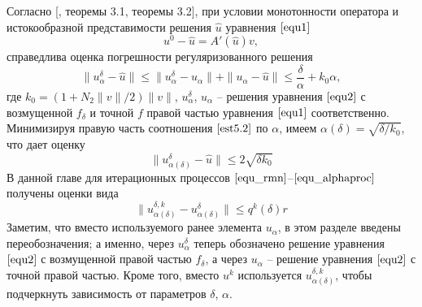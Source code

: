 Согласно [\cite{Tau2002}, теоремы 3.1, теоремы 3.2], при условии монотонности оператора и истокообразной представимости решения $\hat{u}$ уравнения $\eqref{equ1}$
\begin{equation}\label{cond5.1}
u^0-\hat{u}=A'(\hat{u})v,
\end{equation}
справедлива оценка погрешности регуляризованного решения
\begin{equation}\label{est5.2}
\|u_\alpha^{\delta}-\hat{u}\|\le\|u_\alpha^{\delta}-u_\alpha\|+\|u_\alpha-\hat{u}\|\le\frac{\delta}{\alpha}+k_0\alpha,
\end{equation}
где $k_0=(1+N_2\|v\|/2)\|v\|$, $u_\alpha^{\delta}$, $u_\alpha$ -- решения уравнения $\eqref{equ2}$ с возмущенной $f_\delta$ и точной $f$ правой частью уравнения $\eqref{equ1}$ соответственно. Минимизируя правую часть соотношения $\eqref{est5.2}$ по $\alpha$, имеем $\alpha(\delta)=\sqrt{\delta /k_0}$, что дает оценку
\begin{equation}\label{est5.3}
\|u_{\alpha(\delta)}^{\delta}-\hat{u}\|\le 2\sqrt{\delta k_0}
\end{equation}
В данной главе для итерационных процессов $\eqref{equ_rmn}$--$\eqref{equ_alphaproc}$ получены оценки вида 
\begin{equation}\label{est5.4}
\|u_{\alpha(\delta)}^{\delta, k}-u_{\alpha(\delta)}^{\delta}\|\le q^k(\delta)r
\end{equation}
Заметим, что вместо используемого ранее элемента $u_\alpha$, в этом разделе введены переобозначения; а именно, через $u_\alpha^{\delta}$ теперь обозначено решение уравнения $\eqref{equ2}$ с возмущенной правой частью $f_\delta$, а через $u_\alpha$ -- решение уравнения $\eqref{equ2}$ с точной правой частью. Кроме того, вместо $u^k$ используется $u_{\alpha(\delta)}^{\delta, k}$, чтобы подчеркнуть зависимость от параметров $\delta$, $\alpha$.

